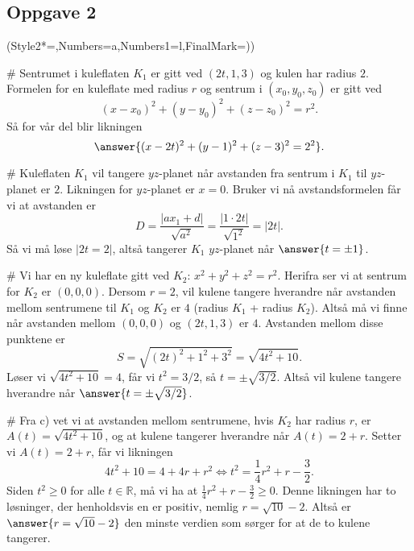\subsection*{Oppgave 2}
\begin{easylist}[enumerate]
	\ListProperties(Style2*=,Numbers=a,Numbers1=l,FinalMark={)})
	
	# Sentrumet i kuleflaten $K_1$ er gitt ved $(2t,1,3)$ og kulen har radius $2$. 
	Formelen for en kuleflate med radius $r$ og sentrum i $(x_0,y_0,z_0)$ er gitt ved 
	\begin{equation*}
	(x-x_0)^2+(y-y_0)^2+(z-z_0)^2=r^2.
	\end{equation*}
	Så for vår del blir likningen 
	\begin{equation*}
	\answer{(x-2t)^2+(y-1)^2+(z-3)^2=2^2}.
	\end{equation*}
	
	# Kuleflaten $K_1$ vil tangere $yz$-planet når avstanden fra sentrum i $K_1$ til $yz$-planet er $2$. 
	Likningen for $yz$-planet er $x=0$. 
	Bruker vi nå avstandsformelen får vi at avstanden er
	\begin{equation*}
	D=\frac{|ax_1+d|}{\sqrt{a^2}} = \frac{|1\cdot2t|}{\sqrt{1^2}}=|2t|.
	\end{equation*}
	Så vi må løse $|2t=2|$, altså tangerer $K_1$ $yz$-planet når $\answer{t=\pm1}$.
	
	# Vi har en ny kuleflate gitt ved $K_2:\, x^2+y^2+z^2=r^2$. 
	Herifra ser vi at sentrum for $K_2$ er $(0,0,0)$. 
	Dersom $r=2$, vil kulene tangere hverandre når avstanden mellom sentrumene til $K_1$ og $K_2$ er $4$ (radius $K_1$ + radius $K_2$). 
	Altså må vi finne når avstanden mellom $(0,0,0)$ og $(2t,1,3)$ er $4$. 
	Avstanden mellom disse punktene er 
	\begin{equation*}
	S=\sqrt{(2t)^2+1^2+3^2}=\sqrt{4t^2+10}.
	\end{equation*}
	Løser vi $\sqrt{4t^2+10}=4$, får vi $t^2= 3 / 2$, så $t=\pm \sqrt{3 / 2}$. Altså vil kulene tangere hverandre når $\answer{t= \pm \sqrt{3/2}}$. 
	
	
	# Fra c) vet vi at avstanden mellom sentrumene, hvis $K_2$ har radius $r$, er $A(t)=\sqrt{4t^2+10}$, og at kulene tangerer hverandre når $A(t)=2+r$. 
	Setter vi $A(t)=2+r$, får vi likningen 
	\begin{equation*}
	4t^2+10=4+4r+r^2 \Longleftrightarrow t^2 = \frac14r^2+r-\frac{3}{2}.
	\end{equation*}
	Siden $t^2\geq0$ for alle $t \in \mathbb{R}$, må vi ha at $\frac14r^2+r-\frac{3}{2}\geq0$. 
	Denne likningen har to løsninger, der henholdsvis en er positiv, nemlig $r=\sqrt{10}-2$. 
	Altså er $\answer{r=\sqrt{10}-2}$ den minste verdien som sørger for at de to kulene tangerer.
\end{easylist}


